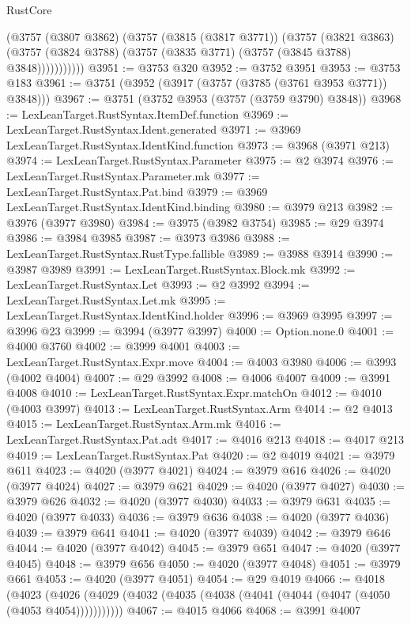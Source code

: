 \begin{lexlean}{RustCore}
\begin{coremodule}
              (@3757
                (@3807 @3862)
                (@3757
                  (@3815 (@3817 @3771))
                  (@3757
                    (@3821 @3863)
                    (@3757 (@3824 @3788) (@3757 (@3835 @3771) (@3757 (@3845 @3788) @3848)))))))))))
@3951 := @3753 @320
@3952 := @3752 @3951
@3953 := @3753 @183
@3961 := @3751 (@3952 (@3917 (@3757 (@3785 (@3761 @3953 @3771)) @3848)))
@3967 := @3751 (@3752 @3953 (@3757 (@3759 @3790) @3848))
@3968 := LexLeanTarget.RustSyntax.ItemDef.function
@3969 := LexLeanTarget.RustSyntax.Ident.generated
@3971 := @3969 LexLeanTarget.RustSyntax.IdentKind.function
@3973 := @3968 (@3971 @213)
@3974 := LexLeanTarget.RustSyntax.Parameter
@3975 := @2 @3974
@3976 := LexLeanTarget.RustSyntax.Parameter.mk
@3977 := LexLeanTarget.RustSyntax.Pat.bind
@3979 := @3969 LexLeanTarget.RustSyntax.IdentKind.binding
@3980 := @3979 @213
@3982 := @3976 (@3977 @3980)
@3984 := @3975 (@3982 @3754)
@3985 := @29 @3974
@3986 := @3984 @3985
@3987 := @3973 @3986
@3988 := LexLeanTarget.RustSyntax.RustType.fallible
@3989 := @3988 @3914
@3990 := @3987 @3989
@3991 := LexLeanTarget.RustSyntax.Block.mk
@3992 := LexLeanTarget.RustSyntax.Let
@3993 := @2 @3992
@3994 := LexLeanTarget.RustSyntax.Let.mk
@3995 := LexLeanTarget.RustSyntax.IdentKind.holder
@3996 := @3969 @3995
@3997 := @3996 @23
@3999 := @3994 (@3977 @3997)
@4000 := Option.none.{0}
@4001 := @4000 @3760
@4002 := @3999 @4001
@4003 := LexLeanTarget.RustSyntax.Expr.move
@4004 := @4003 @3980
@4006 := @3993 (@4002 @4004)
@4007 := @29 @3992
@4008 := @4006 @4007
@4009 := @3991 @4008
@4010 := LexLeanTarget.RustSyntax.Expr.matchOn
@4012 := @4010 (@4003 @3997)
@4013 := LexLeanTarget.RustSyntax.Arm
@4014 := @2 @4013
@4015 := LexLeanTarget.RustSyntax.Arm.mk
@4016 := LexLeanTarget.RustSyntax.Pat.adt
@4017 := @4016 @213
@4018 := @4017 @213
@4019 := LexLeanTarget.RustSyntax.Pat
@4020 := @2 @4019
@4021 := @3979 @611
@4023 := @4020 (@3977 @4021)
@4024 := @3979 @616
@4026 := @4020 (@3977 @4024)
@4027 := @3979 @621
@4029 := @4020 (@3977 @4027)
@4030 := @3979 @626
@4032 := @4020 (@3977 @4030)
@4033 := @3979 @631
@4035 := @4020 (@3977 @4033)
@4036 := @3979 @636
@4038 := @4020 (@3977 @4036)
@4039 := @3979 @641
@4041 := @4020 (@3977 @4039)
@4042 := @3979 @646
@4044 := @4020 (@3977 @4042)
@4045 := @3979 @651
@4047 := @4020 (@3977 @4045)
@4048 := @3979 @656
@4050 := @4020 (@3977 @4048)
@4051 := @3979 @661
@4053 := @4020 (@3977 @4051)
@4054 := @29 @4019
@4066 := @4018
    (@4023 (@4026 (@4029 (@4032 (@4035 (@4038 (@4041 (@4044 (@4047 (@4050 (@4053 @4054)))))))))))
@4067 := @4015 @4066
@4068 := @3991 @4007

\end{coremodule}
\end{lexlean}
